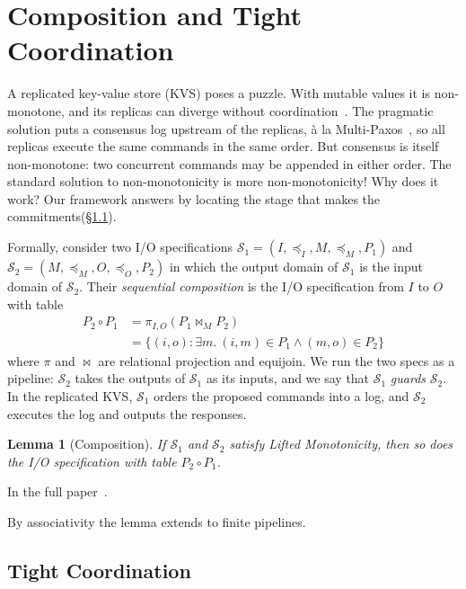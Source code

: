 \documentclass[sigconf]{cidr-2027}
\makeatletter
\newtheorem{lemma}{Lemma}
\theoremstyle{remark}
\newcommand{\InputOrd}{\preceq_I}
\newcommand{\OutputOrd}{\preceq_O}
\newcommand{\commitments}{commitments\xspace}
\newcommand{\Spec}{\mathcal{S}}
\newcommand{\spectype}[1][]{I/O specification#1\xspace}
\newcommand{\proofinfull}{\par\pushQED{\qed}\normalfont\topsep2\p@\relax
  \trivlist\item[\@proofindent\hskip\labelsep{\@proofnamefont\proofname\@addpunct{.}}]%
  \ignorespaces In the full paper~\cite{hellerstein2026completecalmfull}.%
  \popQED\endtrivlist\@endpefalse}
\makeatother
\begin{document}
\section{Composition and Tight Coordination}
\label{sec:composition}

A replicated key-value store (KVS) poses a puzzle.  With mutable values it is
non-monotone, and its replicas can diverge without
coordination~\cite{alvaro2011bloom}.  The pragmatic solution puts a consensus
log upstream of the replicas, \`a la Multi-Paxos~\cite{lamport2001paxos}, so
all replicas execute the same commands in the same order.  But consensus is
itself non-monotone: two concurrent commands may be appended in either order.
The standard solution to non-monotonicity is more non-monotonicity!  Why does
it work?  Our framework answers by locating the stage that makes the
\commitments (\S\ref{sec:tight-coordination}).
\label{sec:sequential-composition}

Formally, consider two \spectype[s]
${\Spec_1=(I,\InputOrd,M,\preceq_M,P_1)}$ and
${\Spec_2=(M,\preceq_M,O,\OutputOrd,P_2)}$
in which the output domain of $\Spec_1$ is the input domain of $\Spec_2$.  Their
\emph{sequential composition} is the \spectype from $I$ to $O$ with table
\begin{equation}
\begin{split}
  P_2\circ P_1
  &=\pi_{I,O}(P_1\Join_M P_2)\\
  &=\{(i,o):\exists m.\ (i,m)\in P_1\land(m,o)\in P_2\}
\end{split}
  \label{eq:spec-composition}
\end{equation}
where $\pi$ and $\Join$ are relational projection and equijoin.  We run the two specs as a pipeline: $\Spec_2$ takes the outputs of $\Spec_1$ as
its inputs, and we say that $\Spec_1$ \emph{guards} $\Spec_2$.  In the replicated
KVS, $\Spec_1$ orders the proposed commands into a log, and $\Spec_2$
executes the log and outputs the responses.

\begin{lemma}[Composition]
\label{lem:composition}
If $\Spec_1$ and $\Spec_2$ satisfy Lifted Monotonicity, then so does the
\spectype with table $P_2\circ P_1$.
\end{lemma}

\proofinfull

By associativity the lemma extends to finite pipelines.

\subsection{Tight Coordination}
\label{sec:tight-coordination}
\end{document}
